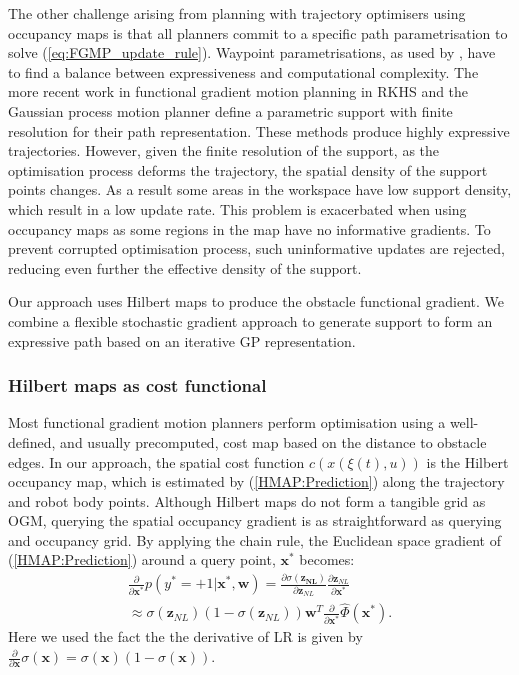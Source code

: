 \documentclass[letterpaper, 10 pt, conference]{ieeeconf}  %
\begin{document}
The other challenge arising from planning with trajectory optimisers using occupancy maps is that all planners commit to a specific path parametrisation to solve (\ref{eq:FGMP_update_rule}). Waypoint parametrisations, as used by \cite{Zucker2013, Kalakrishnan2011,park2012itomp}, have to find a balance between expressiveness and computational complexity. The more recent work in functional gradient motion planning in RKHS \cite{Marinho2016} and the Gaussian process motion planner \cite{mukadam2016gaussian,Dong2016} define a parametric support with finite resolution for their path representation. These methods produce highly expressive trajectories. However, given the finite resolution of the support, as the optimisation process deforms the trajectory, the spatial density of the support points changes. As a result some areas in the workspace have low support density, which result in a low update rate. This problem is exacerbated when using occupancy maps as some regions in the map have no informative gradients. To prevent corrupted optimisation process, such uninformative updates are rejected, reducing even further the effective density of the support.

Our approach uses Hilbert maps to produce the obstacle functional gradient. We combine a flexible stochastic gradient approach to generate support to form an expressive path based on an iterative GP representation. 

\subsubsection{Hilbert maps as cost functional}

Most functional gradient motion planners perform optimisation using a well-defined, and usually precomputed, cost map based on the distance to obstacle edges. In our approach, the spatial cost function $c(x(\xi(t),u))$ is the Hilbert occupancy map, which is estimated by (\ref{HMAP:Prediction}) along the trajectory and robot body points.
Although Hilbert maps do not form a tangible grid as OGM, querying the spatial occupancy gradient is as straightforward as querying and occupancy grid. By applying the chain rule, the Euclidean space gradient of (\ref{HMAP:Prediction}) around a query point, $\boldsymbol{x}^*$ becomes:
\begin{equation}\label{eq:HMAP:grad}
\begin{split}
	\frac{\partial}{\partial\boldsymbol{x}^*}p(y^* = +1|\boldsymbol{x}^*,\boldsymbol{w})=\frac{\partial \sigma(\boldsymbol{z_{NL}})}{\partial \boldsymbol{z}_{NL}}\frac{\partial \boldsymbol{z}_{NL}}{\partial \boldsymbol{x}^*}  \\
	\approx \sigma(\boldsymbol{z}_{NL})(1-\sigma(\boldsymbol{z}_{NL}))\boldsymbol{w}^T\frac{\partial }{\partial\boldsymbol{x}^*} \hat{\Phi}(\boldsymbol{x}^*).	
\end{split}
\end{equation}
Here we used the fact the the derivative of LR is given by $\frac{\partial}{\partial \boldsymbol{x}}\sigma(\boldsymbol{x})=\sigma(\boldsymbol{x})(1-\sigma(\boldsymbol{x}))$.
\end{document}
